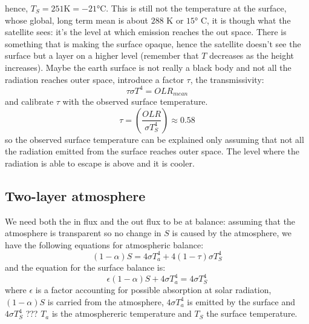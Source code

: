 hence, $T_S=251 \text{K}=-21°\text{C}$. This is still not the temperature at the surface, whose global, long term
mean is about $288$ K or $15°$ C, it is though what the satellite sees: it's the level at which emission reaches the out space. There is something that is making the surface opaque, hence the satellite doesn't see the surface but a layer on a higher level (remember that $T$ decreases as the height increases). 
Maybe the earth surface is not really a black body and not all the
radiation reaches outer space, introduce a factor $\tau$, the transmissivity:
$$\tau\sigma T^4=OLR_{mean}$$
and calibrate $\tau$ with the observed surface temperature. 
\begin{equation}\label{eq.tau}
    \tau=\left(\frac{OLR}{\sigma T_S^4}\right)\approx 0.58
\end{equation}
so the observed surface temperature can be explained only assuming that not all the radiation emitted from the surface reaches outer space. The level where the radiation is able to escape is above and it is cooler. 
\subsection{Two-layer atmosphere}
We need both the in flux and the out flux to be at balance: assuming that the atmosphere is transparent so no change in $S$ is caused by the atmosphere, we have the following equations for atmospheric balance:
\begin{equation}\label{eq.two layer}
    (1-\alpha)S=4\sigma T^4_{a}+4(1-\tau)\sigma T_S^4
\end{equation}
and the equation for the surface balance is:
\begin{equation}\label{eq.surface balance}
    \epsilon (1-\alpha)S+4\sigma T_a^4=4\sigma T_S^4
\end{equation}
where $\epsilon$ is a factor accounting for possible absorption at solar radiation, $(1-\alpha)S$ is carried from the atmosphere, $4\sigma T_a^4$ is emitted by the surface and $4\sigma T_S^4$ ??? %
$T_a$ is the atmosphereric temperature and $T_S$ the surface temperature. 


